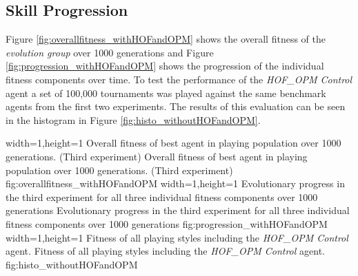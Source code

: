 \subsection{Skill Progression}
Figure \ref{fig:overallfitness_withHOFandOPM} shows the overall fitness of the \textit{evolution group} over 1000 generations and Figure \ref{fig:progression_withHOFandOPM} shows the progression of the individual fitness components over time. To test the performance of the \textit{HOF\_OPM Control} agent a set of 100,000 tournaments was played against the same benchmark agents from the first two experiments. The results of this evaluation can be seen in the histogram in Figure \ref{fig:histo_withoutHOFandOPM}. \par
{}%
  {width=1\textwidth,height=1\textheight}%
  {Overall fitness of best agent in playing population over 1000 generations. (Third experiment)}%
  {Overall fitness of best agent in playing population over 1000 generations. (Third experiment)}%
  {fig:overallfitness_withHOFandOPM}%
  {width=1\textwidth,height=1\textheight}%
  {Evolutionary progress in the third experiment for all three individual fitness components over 1000 generations}%
  {Evolutionary progress in the third experiment for all three individual fitness components over 1000 generations}%
  {fig:progression_withHOFandOPM}%
  {width=1\textwidth,height=1\textheight}%
  {Fitness of all playing styles including the \textit{HOF\_OPM Control} agent.}%
  {Fitness of all playing styles including the \textit{HOF\_OPM Control} agent.}%
  {fig:histo_withoutHOFandOPM}%
